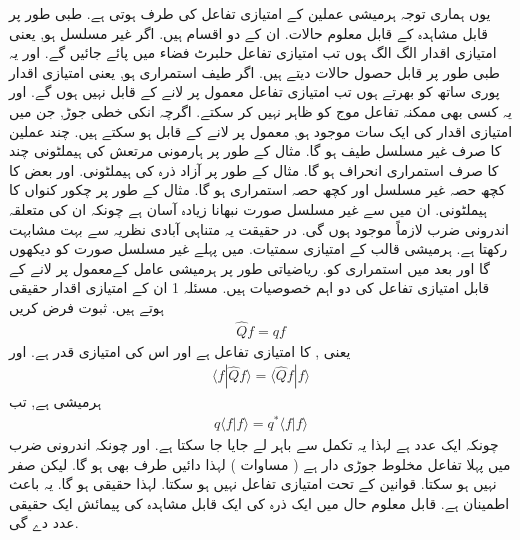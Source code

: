 %
یوں ہماری توجہ ہرمیشی عملین کے امتیازی تفاعل کی طرف ہوتی ہے. طبی طور پر قابل مشاہدہ کے قابل معلوم حالات. ان کے دو اقسام ہیں. اگر غیر مسلسل ہو, یعنی امتیازی اقدار الگ الگ ہوں تب امتیازی تفاعل حلبرٹ فضاء میں پائے جائیں گے. اور یہ طبی طور پر قابل حصول حالات دیتے ہیں. اگر طیف استمراری ہو, یعنی امتیازی اقدار پوری ساتھ کو بھرتے ہوں تب امتیازی تفاعل معمول پر لانے کے قابل نہیں ہوں گے. اور یہ کسی بھی ممکنہ تفاعل موج کو ظاہر نہیں کر سکتے. اگرچہ انکی خطی جوڑ, جن میں امتیازی اقدار کی ایک سات موجود ہو, معمول پر لانے کے قابل ہو سکتے ہیں. چند عملین کا صرف غیر مسلسل طیف ہو گا. مثال کے طور پر ہارمونی مرتعش کی ہیملٹونی چند کا صرف استمراری انحراف ہو گا. مثال کے طور پر آزاد ذرہ کی ہیملٹونی. اور بعض کا کچھ حصہ غیر مسلسل اور کچھ حصہ استمراری ہو گا. مثال کے طور پر چکور کنواں کا ہیملٹونی. ان میں سے غیر مسلسل صورت نبھانا زیادہ آسان ہے چونکہ ان کی متعلقہ اندرونی ضرب لازماً موجود ہوں گی. در حقیقت یہ متناہی آبادی نظریہ سے بہت مشابہت رکھتا ہے. ہرمیشی قالب کے امتیازی سمتیات. میں پہلے غیر مسلسل صورت کو دیکھوں گا اور بعد میں استمراری کو. 
ریاضیاتی طور پر ہرمیشی عامل کےمعمول پر لانے کے قابل امتیازی تفاعل کی دو اہم خصوصیات ہیں. 
مسئلہ 1
ان کے امتیازی اقدار حقیقی ہوتے ہیں. 
ثبوت 
فرض کریں
\begin{align*}
\hat{Q}f = qf 
\end{align*}
یعنی 
 ,  کا امتیازی تفاعل ہے اور اس کی امتیازی قدر  ہے. اور 
\begin{align*}
\langle f | \hat{Q}  f \rangle = \langle \hat{Q} f | f  \rangle
\end{align*}
 ہرمیشی ہے, تب
\begin{align*}
q\langle f \left\vert f \right.  \rangle = q^{*} \langle f \left\vert f \right. \rangle
\end{align*}
چونکہ  ایک عدد ہے لہذا یہ تکمل سے باہر لے جایا جا سکتا ہے. اور چونکہ اندرونی ضرب میں پہلا تفاعل مخلوط جوڑی دار ہے ( مساوات  ) لہذا دائیں طرف   بھی ہو گا. لیکن   صفر نہیں ہو سکتا. قوانین کے تحت  امتیازی تفاعل نہیں ہو سکتا. لہذا  حقیقی ہو گا. یہ باعث اطمینان ہے. قابل معلوم حال میں ایک ذرہ کی ایک قابل مشاہدہ کی پیمائش ایک حقیقی عدد دے گی. 
